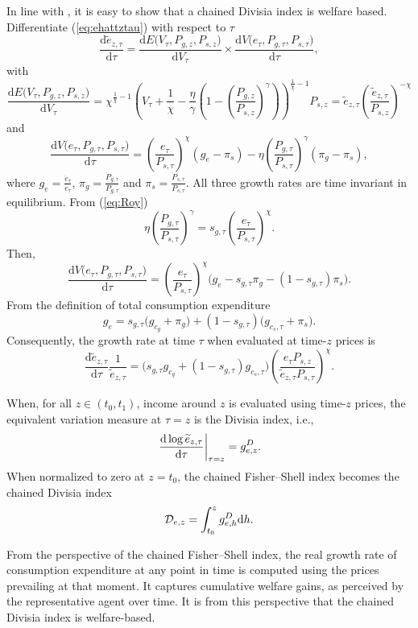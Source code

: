 \documentclass[12pt,a4paper]{article}
\begin{document}
\begin{appendices}
In line with \cite{duran_licandro_2024}, it is easy to show that a chained Divisia index is welfare based.
Differentiate (\ref{eq:ehattztau}) with respect to $\tau$ 
\[
\frac{\text{d}\widetilde{e}_{z,\tau}}{\text{d}\tau}= 
 \frac{\text{d}E\big( V_\tau, P_{g,z}, P_{s,z}\big)}{\text{d}V_\tau}
  \times \frac{\text{d}V\big(e_{\tau}, P_{g,\tau}, P_{s,\tau}\big)}{\text{d}\tau},
\]
with
\[
\frac{\text{d}E\big( V_\tau, P_{g,z}, P_{s,z}\big)}{\text{d}V_\tau}
=
\chi^{\frac{1}{\chi}-1}\left(V_{\tau}+\frac{1}{\chi}-\frac{\eta}{\gamma}\left(1-\left(\frac{P_{g,z}}{P_{s,z}}\right)^{\gamma}\right)\right)^{\frac{1}{\chi}-1}P_{s,z} =
\widetilde e_{z,\tau} \left( \frac{\widetilde e_{z,\tau}}{P_{s,z}}\right)^{-\chi}
\]
and
\[
\frac{\text{d}V\big(e_{\tau}, P_{g,\tau}, P_{s,\tau}\big)}{\text{d}\tau} =
 \left( \frac{e_\tau}{P_{s,\tau}} \right)^{\chi} 
 \left( g_{e} - \pi_s \right) - 
 \eta  \left( \frac{P_{g,\tau}}{P_{s,\tau}} \right)^\gamma  \left( \pi_g - \pi_s \right) ,
\]
where $g_{e} = \frac{\dot e_\tau}{e_{\tau}}$, $\pi_g = \frac{ \dot P_{g,\tau}}{P_{g,\tau}}$ and $\pi_s = \frac{ \dot P_{s,\tau}}{P_{s,\tau}}$. All three growth rates are time invariant in equilibrium.
From (\ref{eq:Roy})
\[
\eta \left( \frac{P_{g,\tau}}{P_{s,\tau}} \right)^\gamma = s_{g,\tau} \left( \frac{e_\tau}{P_{s,\tau}} \right)^{\chi} .
\]
Then, 
\[
\frac{\text{d}V\big(e_{\tau}, P_{g,\tau}, P_{s,\tau}\big)}{\text{d}\tau} =
 \left( \frac{e_\tau}{P_{s,\tau}} \right)^{\chi}
 \Big(  g_e  - 
 s_{g,\tau}  \pi_g
 - (1 -  s_{g,\tau}) \pi_s
 \Big) .
\]
From the definition of total consumption expenditure
\[
g_e = s_{g,\tau} \big( g_{c_g} + \pi_g \big) +  (1 - s_{g,\tau}) \big(g_{c_s,\tau} + \pi_s \big).
\]
Consequently, the growth rate at time $\tau$ when evaluated at time-$z$ prices is
\[
\frac{\text{d}\widetilde{e}_{z,\tau}}{\text{d}\tau} \frac{1}{\widetilde{e}_{z,\tau}}= \Big(s_{g,\tau}  g_{c_g} + (1- s_{g,\tau})g_{c_s,\tau}\Big) 
\left( \frac{e_\tau P_{s,z} }{\widetilde e_{z,\tau} P_{s,\tau}}\right)^{\chi} .
\]

When, for all $z\in(t_0,t_1)$, income around $z$ is evaluated using time-$z$ prices, the equivalent variation measure at $\tau = z$ is the Divisia index, i.e., 
\[
\left. \frac{\textnormal{d} \log \widetilde{e}_{z,\tau}}{\textnormal{d}\tau} \right|_{\tau=z} 
= g^D_{e,z}  .
\]
 When normalized to zero at $z=t_0$, the chained Fisher–Shell index becomes the chained Divisia index
\[
{\cal D}_{e,z} = {\int_{t_0}^z g^{D}_{e,h} \text{d}h}.
\]

From the perspective of the chained Fisher–Shell index, the real growth rate of consumption expenditure at any point in time is computed using the prices prevailing at that moment.  
It captures cumulative welfare gains, as perceived by the representative agent over time.  
It is from this perspective that the chained Divisia index is welfare-based.  


\end{appendices}
\end{document}
